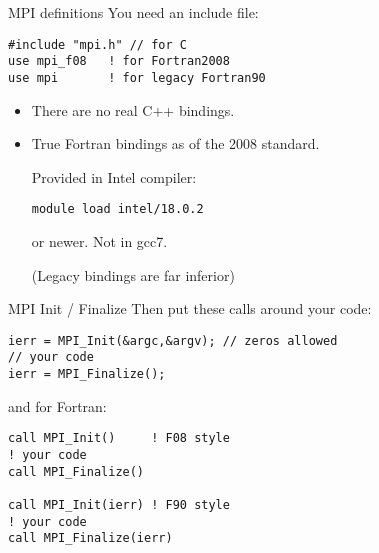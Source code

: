 \begin{frame}[containsverbatim]{MPI definitions}
\label{sl:mpi-header}
You need an include file:
\begin{verbatim}
#include "mpi.h" // for C
use mpi_f08   ! for Fortran2008
use mpi       ! for legacy Fortran90
\end{verbatim}
\begin{itemize}
\item There are no real C++ bindings.
\item True Fortran bindings as of the 2008 standard.
\begin{tacc}
Provided in Intel compiler:
\begin{verbatim}
module load intel/18.0.2
\end{verbatim}
or newer. Not in gcc7.
\end{tacc}
(Legacy bindings are far inferior)
\end{itemize}
\end{frame}

\begin{frame}[containsverbatim]{MPI Init / Finalize}
Then put these calls around your code:
\lstset{language=C}
\begin{lstlisting}
ierr = MPI_Init(&argc,&argv); // zeros allowed
// your code
ierr = MPI_Finalize();
\end{lstlisting}
and for Fortran:
\lstset{language=Fortran}
\begin{lstlisting}
call MPI_Init()     ! F08 style
! your code
call MPI_Finalize()

call MPI_Init(ierr) ! F90 style
! your code
call MPI_Finalize(ierr)
\end{lstlisting}
\end{frame}
